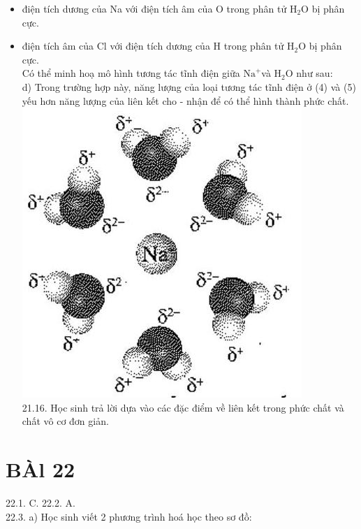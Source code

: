 \documentclass[10pt]{article}
\begin{document}
\begin{itemize}
  \item điện tích dương của Na với điện tích âm của O trong phân tử $\mathrm{H}_{2} \mathrm{O}$ bị phân cực.
  \item điện tích âm của Cl với điện tích dương của H trong phân tử $\mathrm{H}_{2} \mathrm{O}$ bị phân cực.\\
Có thể minh hoạ mô hình tương tác tĩnh điện giữa $\mathrm{Na}^{+}$và $\mathrm{H}_{2} \mathrm{O}$ như sau:\\
d) Trong trường hợp này, năng lượng của loại tương tác tĩnh điện ở (4) và (5) yếu hơn năng lượng của liên kết cho - nhận để có thể hình thành phức chất.\\
\includegraphics[max width=\textwidth, center]{2025_10_23_3f52bbaab6caa9e2ff75g-25}\\
21.16. Học sinh trả lời dựa vào các đặc điểm về liên kết trong phức chất và chất vô cơ đơn giản.
\end{itemize}

\section*{BÀl 22}
22.1. C. 22.2. A.\\
22.3. a) Học sinh viết 2 phương trình hoá học theo sơ đồ:
\end{document}

